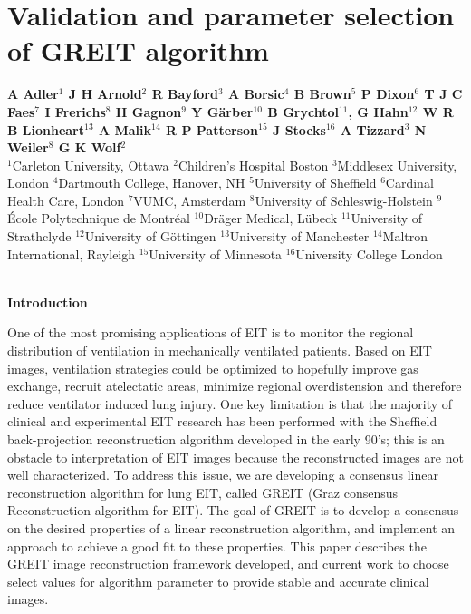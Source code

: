\documentclass[12pt]{article}
\newcommand{\mysection}[1]{
~\\ \noindent
{\bf \normalsize #1}
\vspace{1mm}
}
\begin{document}
\renewcommand\refname{}


\section*{%
Validation and parameter selection of GREIT algorithm
}

\begin{list}{}{\setlength\leftmargin{25mm}}
\item[]\raggedright
 \footnotesize
{\bf
        A Adler$^{1}$
        J H Arnold$^{2}$
        R Bayford$^{3}$
        A Borsic$^{4}$
        B Brown$^{5}$
        P Dixon$^{6}$
        T J C Faes$^{7}$
        I Frerichs$^{8}$
        H Gagnon$^{9}$
        Y G\"arber$^{10}$
        B Grychtol$^{11}$, 
        G Hahn$^{12}$
        W R B Lionheart$^{13}$
        A Malik$^{14}$
        R P Patterson$^{15}$
        J Stocks$^{16}$
        A Tizzard$^{3}$
        N Weiler$^{8}$
        G K Wolf$^{2}$
}
\\
          $^{1}$Carleton University, Ottawa
          $^{2}$Children's Hospital Boston
          $^{3}$Middlesex University, London
          $^{4}$Dartmouth College, Hanover, NH
          $^{5}$University of Sheffield
          $^{6}$Cardinal Health Care, London
          $^{7}$VUMC, Amsterdam
          $^{8}$University of Schleswig-Holstein
          $^{9}$\'Ecole Polytechnique de Montr\'eal
         $^{10}$Dr\"ager Medical, L\"ubeck
         $^{11}$University of Strathclyde
         $^{12}$University of G\"ottingen
         $^{13}$University of Manchester
         $^{14}$Maltron International, Rayleigh
         $^{15}$University of Minnesota
         $^{16}$University College London
\end{list}

\vspace{-5mm}
\small
\mysection{Introduction}

One of the most promising applications of EIT is to monitor the
regional distribution of ventilation in mechanically
ventilated patients.
Based on EIT images, ventilation strategies could be
optimized to hopefully improve gas exchange, recruit
atelectatic areas, minimize regional overdistension and
therefore reduce ventilator induced lung injury.
One key limitation is that
the majority of clinical and experimental EIT research
has been performed with the Sheffield back-projection
reconstruction algorithm developed in the early 90's; this
is an obstacle to interpretation of EIT images because
the reconstructed images are not well characterized. To
address this issue, we are developing a consensus linear
reconstruction algorithm for lung EIT, called GREIT (Graz
consensus Reconstruction algorithm for EIT).  The goal of
GREIT is to develop a consensus on the desired properties
of a linear reconstruction algorithm, and implement an
approach to achieve a good fit to these properties.
This paper describes the GREIT image reconstruction
framework developed, and
current work to choose select values for
algorithm parameter to provide stable and 
accurate clinical images.
\end{document}
